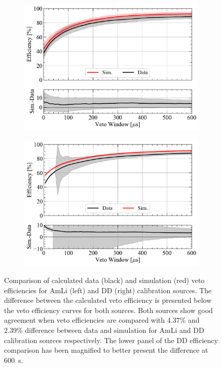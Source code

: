 \begin{figure}[h!]
    \centering
    \begin{subfigure}[b]{0.49\textwidth}
        \centering
        \includegraphics[width=\textwidth]{figures/VetoEfficiency/AmLi_Total_Avg_Ratio.pdf}
        \caption{}
        \label{fig:VetoEff/Sim2DataVetoEffComparisons_AmLi}
    \end{subfigure}
    \hfill
    \begin{subfigure}[b]{0.49\textwidth}
        \centering
        \includegraphics[width=\textwidth]{figures/VetoEfficiency/DDDirect_Total_Ratio.pdf}
        \caption{}
        \label{fig:VetoEff/Sim2DataVetoEffComparisons_DD}
    \end{subfigure}
    \caption[Comparison of calculated data and simulation veto efficiencies for AmLi and DD calibration sources.]{Comparison of calculated data (black) and simulation (red) veto efficiencies for AmLi (left) and DD (right) calibration sources. The difference between the calculated veto efficiency is presented below the veto efficiency curves for both sources. Both sources show good agreement when veto efficiencies are compared with $4.37\%$ and $2.39\%$ difference between data and simulation for AmLi and DD calibration sources respectively. The lower panel of the DD efficiency comparison has been magnified to better present the difference at 600~\textmu s.}
    \label{fig:VetoEff/Sim2DataVetoEffComparisons}
\end{figure}

